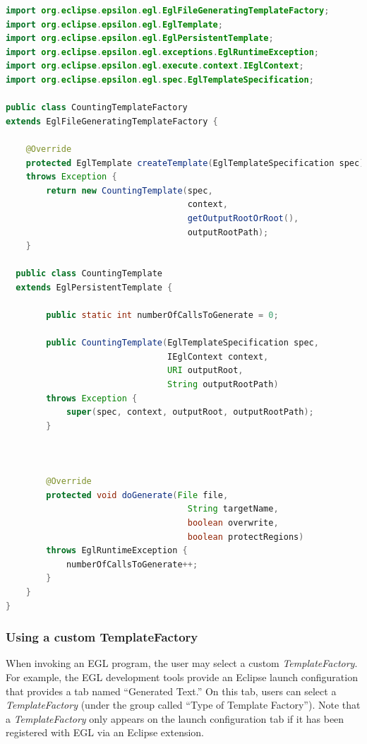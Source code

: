 \begin{lstlisting}[basicstyle=\ttfamily\footnotesize, language=Java, tabsize=2, flexiblecolumns=true, caption=A simple customisation of the co-ordination engine to count the number of calls to \texttt{generate()}., label=lst:custom_co-ordination_example]
import org.eclipse.epsilon.egl.EglFileGeneratingTemplateFactory;
import org.eclipse.epsilon.egl.EglTemplate;
import org.eclipse.epsilon.egl.EglPersistentTemplate;
import org.eclipse.epsilon.egl.exceptions.EglRuntimeException;
import org.eclipse.epsilon.egl.execute.context.IEglContext;
import org.eclipse.epsilon.egl.spec.EglTemplateSpecification;

public class CountingTemplateFactory 
extends EglFileGeneratingTemplateFactory {

	@Override
	protected EglTemplate createTemplate(EglTemplateSpecification spec) 
	throws Exception {
		return new CountingTemplate(spec,
		                            context,
		                            getOutputRootOrRoot(),
		                            outputRootPath);
	}	

  public class CountingTemplate 
  extends EglPersistentTemplate {

		public static int numberOfCallsToGenerate = 0;

		public CountingTemplate(EglTemplateSpecification spec,
		                        IEglContext context,
		                        URI outputRoot,
		                        String outputRootPath)
		throws Exception {
			super(spec, context, outputRoot, outputRootPath);
		}



		@Override
		protected void doGenerate(File file,
			                        String targetName,
			                        boolean overwrite,
			                        boolean protectRegions) 
		throws EglRuntimeException {
			numberOfCallsToGenerate++;
		}
	}
}
\end{lstlisting}

\subsubsection{Using a custom TemplateFactory}
When invoking an EGL program, the user may select a custom \emph{TemplateFactory}.
For example, the EGL development tools provide an Eclipse launch configuration that 
provides a tab named ``Generated Text.'' On this tab, users can select a 
\emph{TemplateFactory} (under the group called ``Type of Template Factory''). 
Note that a \emph{TemplateFactory} only appears on the launch configuration tab 
if it has been registered with EGL via an Eclipse extension.

